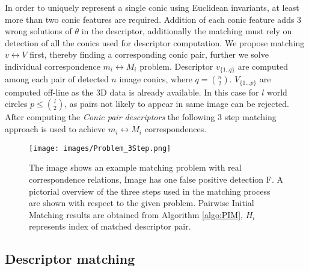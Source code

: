 \documentclass{bmvc2k}
\begin{document}
In order to uniquely represent a single conic using Euclidean invariants, at least more than two conic features are required. 
Addition of each conic feature adds 3 wrong solutions of $ \theta $ in the descriptor, additionally the matching must rely on detection of all the conics used for descriptor computation. 
We propose matching $ v \leftrightarrow V $ first, thereby finding a corresponding conic pair, further we solve individual correspondence $ m_i \leftrightarrow M_i $ problem. 
Descriptor $ v_{\{1..q\}} $ are computed among each pair of detected $ n $ image conics, where $ q = \binom{n}{2} $. 
$ V_{\{1...p\}} $ are computed off-line as the 3D data is already available.
In this case for $ l $ world circles  $ p \leq \binom{l}{2} $, as pairs not likely to appear in same image can be rejected. 
After computing the \textit{Conic pair descriptors} the following 3 step matching approach is used to achieve $ m_i \leftrightarrow M_i $ correspondences. 

\begin{figure}
\centering

\texttt{[image: images/Problem\_3Step.png]}
\caption{ The image shows an example matching problem with real correspondence relations, Image has one false positive detection F. A pictorial overview of the three steps used in the matching process are shown with respect to the given problem. Pairwise Initial Matching results are obtained from Algorithm \ref{algo:PIM}, $ H_i $ represents index of matched descriptor pair.  
 \label{fig:matchingAndProblem}}
\end{figure}

\subsection{Descriptor matching}
\label{ssec:matching}
\end{document}
